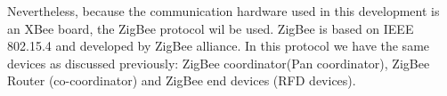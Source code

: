  Nevertheless, because the communication hardware used in this development is an XBee board, the ZigBee protocol wil be used. ZigBee is based on IEEE 802.15.4 and developed by ZigBee alliance. In this protocol we have the same devices as discussed previously: ZigBee coordinator(Pan coordinator), ZigBee Router (co-coordinator) and ZigBee end devices (RFD devices).
\\
